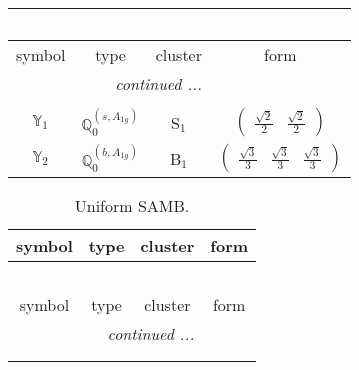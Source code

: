 \documentclass[fleqn,10pt,landscape]{article}
\begin{document}
\begin{itemize}
\begin{center}
\begin{longtable}{c|c|c|c}
\multicolumn{3}{l}{\tablename\ \thetable{}} \\
 \hline \hline
symbol & type & cluster & form \\ \hline \endhead

 \hline \hline
\multicolumn{3}{r}{\footnotesize\it continued ...} \\ \endfoot

 \hline \hline
\multicolumn{3}{r}{} \\ \endlastfoot

$ \mathbb{Y}_{1} $ & $\mathbb{Q}_{0}^{(s,A_{1g})}$ & S$_{1}$ & $\begin{pmatrix} \frac{\sqrt{2}}{2} & \frac{\sqrt{2}}{2} \end{pmatrix}$ \\ \hline
$ \mathbb{Y}_{2} $ & $\mathbb{Q}_{0}^{(b,A_{1g})}$ & B$_{1}$ & $\begin{pmatrix} \frac{\sqrt{3}}{3} & \frac{\sqrt{3}}{3} & \frac{\sqrt{3}}{3} \end{pmatrix}$ \\
\end{longtable}
\end{center}
\begin{center}
\renewcommand{\arraystretch}{1.3}
\begin{longtable}{c|c|c|c}
\caption{Uniform SAMB.}
 \\
 \hline \hline
symbol & type & cluster & form \\ \hline \endfirsthead

\multicolumn{3}{l}{\tablename\ \thetable{}} \\
 \hline \hline
symbol & type & cluster & form \\ \hline \endhead

 \hline \hline
\multicolumn{3}{r}{\footnotesize\it continued ...} \\ \endfoot

 \hline \hline
\multicolumn{3}{r}{} \\ \endlastfoot


\end{longtable}
\end{center}
\end{itemize}
\end{document}
